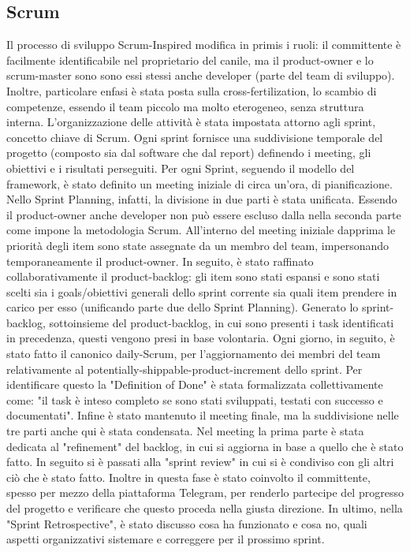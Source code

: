     \subsection{Scrum}
    Il processo di sviluppo Scrum-Inspired modifica in primis i ruoli: il committente è facilmente identificabile nel proprietario del canile, ma il product-owner e lo scrum-master sono sono essi stessi anche developer (parte del team di sviluppo). 
    Inoltre, particolare enfasi è stata posta sulla cross-fertilization, lo scambio di competenze, essendo il team piccolo ma molto eterogeneo, senza struttura interna.
    L'organizzazione delle attività è stata impostata attorno agli sprint, concetto chiave di Scrum. Ogni sprint fornisce una suddivisione temporale del progetto (composto sia dal software che dal report) definendo i meeting, gli obiettivi e i risultati perseguiti. Per ogni Sprint, seguendo il modello del framework, è stato definito un meeting iniziale di circa un'ora, di pianificazione. 
    Nello Sprint Planning, infatti, la divisione in due parti è stata unificata. Essendo il product-owner anche developer non può essere escluso dalla nella seconda parte come impone la metodologia Scrum. 
    All'interno del meeting iniziale dapprima le priorità degli item sono state assegnate da un membro del team, impersonando temporaneamente il product-owner. In seguito, è stato raffinato collaborativamente il product-backlog: gli item sono stati espansi e sono stati scelti sia i goals/obiettivi generali dello sprint corrente sia quali item prendere in carico per esso (unificando parte due dello Sprint Planning).
    Generato lo sprint-backlog, sottoinsieme del product-backlog, in cui sono presenti i task identificati in precedenza, questi vengono presi in base volontaria. 
    Ogni giorno, in seguito, è stato fatto il canonico daily-Scrum, per l'aggiornamento dei membri del team relativamente al potentially-shippable-product-increment dello sprint.
    Per identificare questo la "Definition of Done" è stata formalizzata collettivamente come: "il task è inteso completo se sono stati sviluppati, testati con successo e documentati".
    Infine è stato mantenuto il meeting finale, ma la suddivisione nelle tre parti anche qui è stata condensata. 
    Nel meeting la prima parte è stata dedicata al "refinement" del backlog, in cui si aggiorna in base a quello che è stato fatto. In seguito si è passati alla "sprint review" in cui si è condiviso con gli altri ciò che è stato fatto. Inoltre in questa fase è stato coinvolto il committente, spesso per mezzo della piattaforma Telegram, per renderlo partecipe del progresso del progetto e verificare che questo proceda nella giusta direzione. In ultimo, nella "Sprint Retrospective", è stato discusso cosa ha funzionato e cosa no, quali aspetti organizzativi sistemare e correggere per il prossimo sprint. 
    
